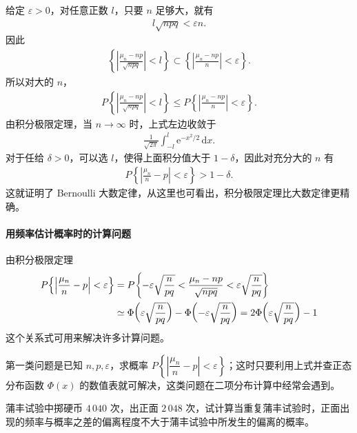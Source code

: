 \documentclass[../../main.tex]{subfiles}
\begin{document}
给定 $\varepsilon>0$，对任意正数 $l$，只要 $n$ 足够大，就有
\begin{align*}
l\sqrt{npq}<\varepsilon n.
\end{align*}
因此
\begin{align*}
\left\{\left|\frac{\mu_n-np}{\sqrt{npq}}\right|<l\right\}\subset\left\{\left|\frac{\mu_n-np}{n}\right|<\varepsilon\right\}.
\end{align*}
所以对大的 $n$，
\begin{align*}
P\!\left\{\left|\frac{\mu_n-np}{\sqrt{npq}}\right|<l\right\}\leqslant P\!\left\{\left|\frac{\mu_n-np}{n}\right|<\varepsilon\right\}.
\end{align*}
由积分极限定理，当 $n\to\infty$ 时，上式左边收敛于
\begin{align*}
\frac{1}{\sqrt{2\pi}}\int_{-l}^{l}\mathrm{e}^{-x^{2}/2}\,\mathrm{d}x.
\end{align*}
对于任给 $\delta>0$，可以选 $l$，使得上面积分值大于 $1-\delta$，因此对充分大的 $n$ 有
\begin{align*}
P\!\left\{\left|\frac{\mu_n}{n}-p\right|<\varepsilon\right\}>1-\delta.
\end{align*}
这就证明了 Bernoulli 大数定律，从这里也可看出，积分极限定理比大数定律更精确。

\paragraph*{用频率估计概率时的计算问题}
由积分极限定理
\begin{align}
P\!\left\{\left|\frac{\mu_n}{n}-p\right|<\varepsilon\right\}
&=P\!\left\{-\varepsilon\sqrt{\frac{n}{pq}}<\frac{\mu_n-np}{\sqrt{npq}}<\varepsilon\sqrt{\frac{n}{pq}}\right\}\notag\\
&\simeq\Phi\!\left(\varepsilon\sqrt{\frac{n}{pq}}\right)-\Phi\!\left(-\varepsilon\sqrt{\frac{n}{pq}}\right)
=2\Phi\!\left(\varepsilon\sqrt{\frac{n}{pq}}\right)-1
\end{align}
这个关系式可用来解决许多计算问题。

第一类问题是已知 $n,p,\varepsilon$，求概率 $P\!\left\{\left|\dfrac{\mu_n}{n}-p\right|<\varepsilon\right\}$；这时只要利用上式并查正态分布函数 $\Phi(x)$ 的数值表就可解决，这类问题在二项分布计算中经常会遇到。

\begin{example}[蒲丰试验]\label{example:ch05-蒲丰试验}
蒲丰试验中掷硬币 $4\,040$ 次，出正面 $2\,048$ 次，试计算当重复蒲丰试验时，正面出现的频率与概率之差的偏离程度不大于蒲丰试验中所发生的偏离的概率。
\end{example}
\end{document}
